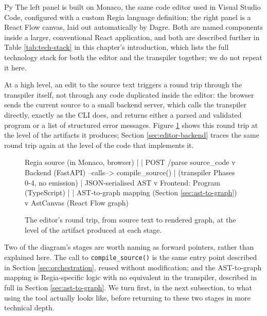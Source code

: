 \begin{codeblock}[]{Py}
The left panel is built on Monaco, the same code editor used in Visual Studio Code, configured with a custom Regia language definition; the right panel is a React Flow canvas, laid out automatically by Dagre. Both are named components inside a larger, conventional React application, and both are described further in Table \ref{tab:tech-stack} in this chapter's introduction, which lists the full technology stack for both the editor and the transpiler together; we do not repeat it here.

At a high level, an edit to the source text triggers a round trip through the transpiler itself, not through any code duplicated inside the editor: the browser sends the current source to a small backend server, which calls the transpiler directly, exactly as the CLI does, and returns either a parsed and validated program or a list of structured error messages. Figure \ref{fig:editor-pipeline} shows this round trip at the level of the artifacts it produces; Section \ref{sec:editor-backend} traces the same round trip again at the level of the code that implements it.

\begin{figure}[h]
    \centering
    \begin{codeblock}[]{}
   Regia source (in Monaco, browser)
         |
         |  POST /parse { source_code }
         v
   Backend (FastAPI)  --calls-->  compile_source()
         |                        (transpiler Phases 0-4, no emission)
         |  JSON-serialised AST
         v
   Frontend: Program (TypeScript)
         |
         |  AST-to-graph mapping (Section \ref{sec:ast-to-graph})
         v
   AstCanvas (React Flow graph)
    \end{codeblock}
    
    \caption{The editor's round trip, from source text to rendered graph, at the level of the artifact produced at each stage.}
    \label{fig:editor-pipeline}
\end{figure}

Two of the diagram's stages are worth naming as forward pointers, rather than explained here. The call to \lstinline|compile_source()| is the same entry point described in Section \ref{sec:orchestration}, reused without modification; and the AST-to-graph mapping is Regia-specific logic with no equivalent in the transpiler, described in full in Section \ref{sec:ast-to-graph}. We turn first, in the next subsection, to what using the tool actually looks like, before returning to these two stages in more technical depth.

\end{codeblock}
